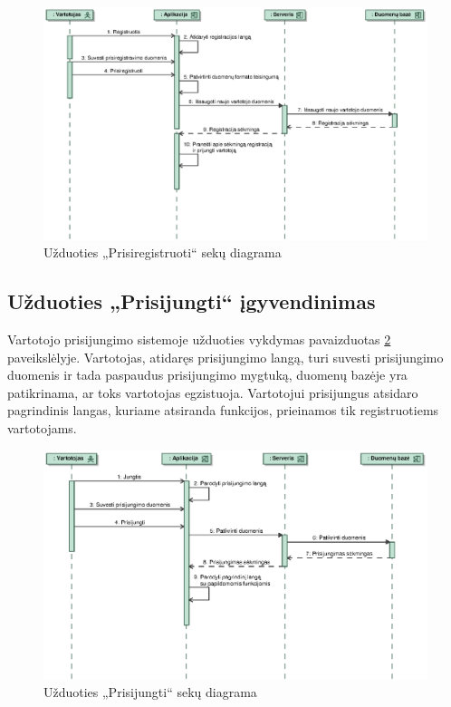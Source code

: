 \documentclass[12pt]{article}
\begin{document}
	\begin{figure}[h]
		\begin{center}
			\includegraphics[width=\textwidth]{Prisiregistruoti.eps}
			\caption{Užduoties „Prisiregistruoti“ sekų diagrama\label{RegisterSeq}}
		\end{center}
	\end{figure}
	
	\pagebreak
	
	\subsection{Užduoties „Prisijungti“ įgyvendinimas}
	Vartotojo prisijungimo sistemoje užduoties vykdymas pavaizduotas \ref{LogInSeq} paveikslėlyje. Vartotojas, atidaręs prisijungimo langą, turi suvesti prisijungimo duomenis ir tada paspaudus prisijungimo mygtuką, duomenų bazėje yra patikrinama, ar toks vartotojas egzistuoja. Vartotojui prisijungus atsidaro pagrindinis langas, kuriame atsiranda funkcijos, prieinamos tik registruotiems vartotojams.
	\begin{figure}[h]
		\begin{center}
			\includegraphics[width=\textwidth]{Prisijungti.eps}
			\caption{Užduoties „Prisijungti“ sekų diagrama\label{LogInSeq}}
		\end{center}
	\end{figure}
	
\end{document}
